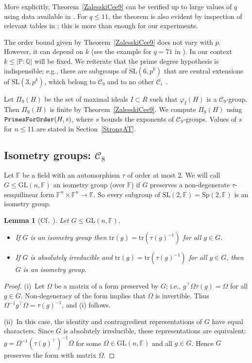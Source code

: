 \documentclass[11pt]{amsart}
\newtheorem{lemma}[theorem]{Lemma}
\theoremstyle{definition}
\theoremstyle{remark}
\newcommand{\F}{\mathbb{F}}
\newcommand{\Q}{\mathbb{Q}}
\renewcommand{\P}{\mathbb{P}}
\newcommand{\GL}{\mathrm{GL}}
\newcommand{\SL}{\mathrm{SL}}
\newcommand{\Sp}{\mathrm{Sp}}
\newcommand{\tr}{\mathrm{tr}}
\newcommand{\calc}{\mathscr{C}}
\begin{document}
More explicitly, Theorem~\ref{ZalesskiCee9} can be verified up to large 
values of $q$ using data 
 available in \cite{Lubeck,Lubeck2}. For $q\leq 11$,  the theorem is
also evident by inspection of  relevant tables in \cite{Brayetal};
this is more than enough for our experiments.

The order bound 
given by Theorem~\ref{ZalesskiCee9} does not vary
with $p$. However, it can depend on $k$ (see the example for $q=71$ in 
\cite[Section~7]{ZalesskiPreprint}).
In our context $k\leq |\P:\Q|$ will be fixed.
We reiterate that the prime degree hypothesis 
is indispensible; e.g., there are subgroups of $\SL(6,p^k)$
that are central extensions of $\SL(3,p^k)$, which belong to 
$\mathscr{C}_9$ and to no other 
$\mathscr{C}_i$~\cite[p.\hspace{1.5pt}389]{Brayetal}.

Let $\Pi_9(H)$ be the set of maximal ideals  $I \subset R$ 
such that $\varphi_I(H)$ is a $\calc_9$-group.
Then $\Pi_9(H)$ is finite by Theorem~\ref{ZalesskiCee9}.
We compute $\Pi_9(H)$ using ${\tt PrimesForOrder}(H, s)$, 
where $s$ bounds the exponents of $\calc_9$-groups. 
Values of $s$ for $n\leq 11$ are 
stated in Section~\ref{StrongAT}.

\subsection{Isometry groups: $\calc_8$} 
\label{Isometry}

Let $\F$ be a field with an automorphism $\tau$ of order 
at most $2$. We will call $G\leq \GL(n, \F)$ an isometry group 
(over $\F$) if $G$ preserves a non-degenerate $\tau$-sesquilinear
form $\F^n\times \F^n\rightarrow \F$. So every subgroup of 
 $\SL(2,\F)=\Sp(2,\F)$ is an isometry group.
\begin{lemma}[{Cf.~\cite[Lemma~2.9]{ExpMath}}] 
\label{Unitary}
Let $G \leq \GL(n, \F)$.
\begin{itemize}
\item[{\rm (i)}] 
 If $G$ is an isometry group then $\tr(g) = \tr(\tau(g)^{-1})$
 for all $g \in G$.
\item[{\rm (ii)}]
If $G$ is absolutely irreducible and $\tr(g) = \tr(\tau(g)^{-1})$
 for all $g \in G$, then $G$ is an isometry group.
\end{itemize}
\end{lemma}
\begin{proof}
(i)~Let $\Omega$ be a matrix of a form preserved by $G$; i.e.,
$g^\top \Omega \tau(g) = \Omega$ for all $g\in G$. Non-degeneracy of 
the form implies that $\Omega$ is invertible. Thus
$\Omega^{-1}g^\top \Omega = \tau(g)^{-1}$, and (i) follows.

(ii)~In this case, the identity and contragredient representations 
of $G$ have equal characters. Since $G$ is absolutely irreducible,
these representations are equivalent: $g = \Omega^{-1}
(\tau(g)^\top)^{-1} \Omega$ for some $\Omega\in \allowbreak \GL(n,\F)$
and all $g\in G$. Hence $G$ preserves the form with matrix $\Omega$.
\end{proof}
\end{document}

